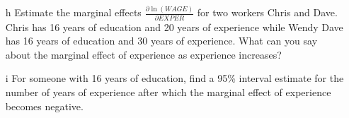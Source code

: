 \documentclass[xcolor={dvipsnames}]{beamer}
\begin{document}
\begin{frame}[allowframebreaks]{5.19}
\begin{itemize}
		
	\item[h] Estimate the marginal effects $\frac{\partial \ln (WAGE)}{ \partial EXPER}$ for two workers Chris and Dave. Chris has 16 years of education and 20 years of experience while Wendy Dave has 16 years of education and 30 years of experience. What can you say about the marginal effect of experience as experience increases?
	
	\item[i] For someone with 16 years of education, find a 95\% interval estimate for the number of years of experience after which the marginal effect of experience becomes negative.

	
\end{itemize}

\end{frame}
\end{document}
